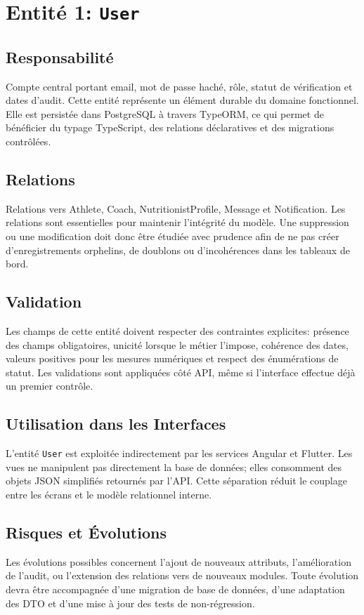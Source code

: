 \section{Entité 1: \texttt{User}}
\subsection{Responsabilité}
Compte central portant email, mot de passe haché, rôle, statut de vérification et dates d’audit. Cette entité représente un élément durable du domaine fonctionnel. Elle est persistée dans PostgreSQL à travers TypeORM, ce qui permet de bénéficier du typage TypeScript, des relations déclaratives et des migrations contrôlées.

\subsection{Relations}
Relations vers Athlete, Coach, NutritionistProfile, Message et Notification. Les relations sont essentielles pour maintenir l'intégrité du modèle. Une suppression ou une modification doit donc être étudiée avec prudence afin de ne pas créer d'enregistrements orphelins, de doublons ou d'incohérences dans les tableaux de bord.

\subsection{Validation}
Les champs de cette entité doivent respecter des contraintes explicites: présence des champs obligatoires, unicité lorsque le métier l'impose, cohérence des dates, valeurs positives pour les mesures numériques et respect des énumérations de statut. Les validations sont appliquées côté API, même si l'interface effectue déjà un premier contrôle.

\subsection{Utilisation dans les Interfaces}
L'entité \texttt{User} est exploitée indirectement par les services Angular et Flutter. Les vues ne manipulent pas directement la base de données; elles consomment des objets JSON simplifiés retournés par l'API. Cette séparation réduit le couplage entre les écrans et le modèle relationnel interne.

\subsection{Risques et Évolutions}
Les évolutions possibles concernent l'ajout de nouveaux attributs, l'amélioration de l'audit, ou l'extension des relations vers de nouveaux modules. Toute évolution devra être accompagnée d'une migration de base de données, d'une adaptation des DTO et d'une mise à jour des tests de non-régression.

